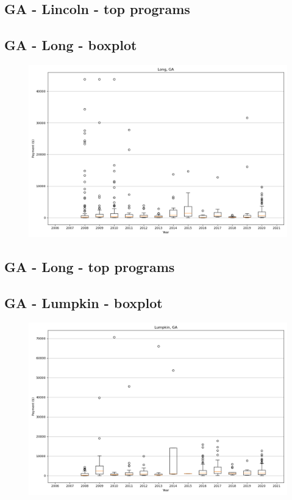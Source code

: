 \subsection*{GA - Lincoln - top programs}

\newpage
\subsection*{GA - Long - boxplot}
\begin{figure}[h]
\centering
\includegraphics[width=7in]{../output/boxplots/counties/Long-GA_boxplot.png}
\end{figure}


\subsection*{GA - Long - top programs}

\newpage
\subsection*{GA - Lumpkin - boxplot}
\begin{figure}[h]
\centering
\includegraphics[width=7in]{../output/boxplots/counties/Lumpkin-GA_boxplot.png}
\end{figure}


